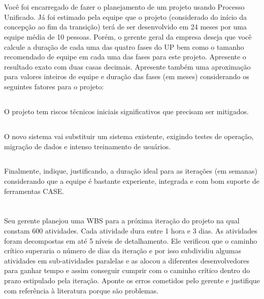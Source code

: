 \documentclass[10pt,a5paper]{report}
\begin{document}
\section{}
\qquad Você foi encarregado de fazer o planejamento de um projeto usando
Processo Unificado. Já foi estimado pela equipe que o projeto (considerado do
início da concepção ao fim da transição) terá de ser desenvolvido em 24 meses
por uma equipe média de 10 pessoas. Porém, o gerente geral da empresa deseja que
você calcule a duração de cada uma das quatro fases do UP bem como o tamanho
recomendado de equipe em cada uma das fases para este projeto. Apresente o
resultado exato com duas casas decimais. Apresente também uma aproximação para
valores inteiros de equipe e duração das fases (em meses) considerando os
seguintes fatores para o projeto:

\subsection{}
\qquad O projeto tem riscos técnicos iniciais significativos que precisam ser
mitigados.

\subsection{}
\qquad O novo sistema vai substituir um sistema existente, exigindo testes de
operação, migração de dados e intenso treinamento de usuários.

\subsection{}
\qquad Finalmente, indique, justificando, a duração ideal para as iterações (em
semanas) considerando que a equipe é bastante experiente, integrada e com bom
suporte de ferramentas CASE.

\section{}

\qquad Seu gerente planejou uma WBS para a próxima iteração do projeto na qual
constam 600 atividades. Cada atividade dura entre 1 hora e 3 dias. As atividades
foram decompostas em até 5 níveis de detalhamento. Ele verificou que o caminho
crítico superaria o número de dias da iteração e por isso subdividiu algumas
atividades em sub-atividades paralelas e as alocou a diferentes desenvolvedores
para ganhar tempo e assim conseguir cumprir com o caminho crítico dentro do
prazo estipulado pela iteração. Aponte os erros cometidos pelo gerente e
justifique com referência à literatura porque são problemas.
\end{document}
